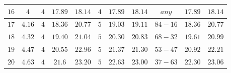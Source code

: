 \begin{center}
\begin{tabular}{|c|c||c|c|c||c|c|c||c|c|c|}
            \hline
            $16$&$4$&$4$&$17.89$ &$18.14$ &$4$& $17.89$ &$18.14$  &$any$&$17.89$ &$18.14$  \\
            \hline
            $17$&$4.16$&$4$&$18.36$ &$20.77$ &$5$& $19.03$ &$19.11$  &$84-16$&$18.36$ &$20.77$  \\
            \hline
            $18$&$4.32$&$4$&$19.40$ &$21.04$ &$5$& $20.30$  &$20.83$  &$68-32$&$19.61$ &$20.99$  \\
            \hline
            $19$&$4.47$&$4$&$20.55$ &$22.96$ &$5$&  $21.37$  &$21.30$  &$53-47$&$20.92$ &$22.21$  \\
            \hline
            $20$&$4.63$&$4$&$21.6$ &$23.20$ &$5$&$22.63$  &$23.00$  &$37-63$&$22.30$ &$23.06$  \\
            \hline     
        \end{tabular}\label{Tab: RMin - k=1/2}
\end{center}